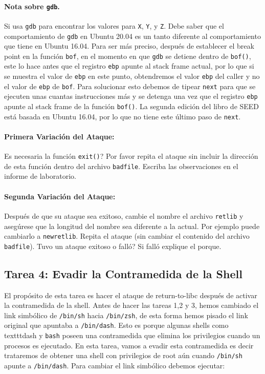 \paragraph{Nota sobre \texttt{gdb}.} Si usa \texttt{gdb} para encontrar los valores para \texttt{X}, \texttt{Y}, y \texttt{Z}. Debe saber que el comportamiento de \texttt{gdb} en Ubuntu 20.04 es un tanto diferente al comportamiento que tiene en Ubuntu 16.04. Para ser más preciso, después de establecer el break point en la función \texttt{bof}, en el momento en que \texttt{gdb} se detiene dentro de \texttt{bof()}, este lo hace antes que el registro \texttt{ebp} apunte al stack frame actual, por lo que si se muestra el valor de \texttt{ebp} en este punto, obtendremos el valor \texttt{ebp} del caller y no el valor de \texttt{ebp} de \texttt{bof}. Para solucionar esto debemos de tipear \texttt{next} para que se ejecuten unas cuantas instrucciones más y se detenga una vez que el registro \texttt{ebp} apunte al stack frame de la función \texttt{bof()}.
La segunda edición del libro de SEED está basada en Ubuntu 16.04, por lo que no tiene este último paso de \texttt{next}.


\paragraph{Primera Variación del Ataque:}
Es necesaria la función \texttt{exit()}? Por favor repita el ataque sin incluir la dirección de esta función dentro del archivo \texttt{badfile}. Escriba las observaciones en el informe de laboratorio.


\paragraph{Segunda Variación del Ataque:} 
Después de que su ataque sea exitoso, cambie el nombre el archivo \texttt{retlib} y asegúrese que la longitud del nombre sea diferente a la actual. Por ejemplo puede cambiarlo a \texttt{newretlib}. Repita el ataque (sin cambiar el contenido del archivo {\tt badfile}). 
Tuvo un ataque exitoso o falló? Si falló explique el porque.

\subsection{Tarea 4: Evadir la Contramedida de la Shell}

El propósito de esta tarea es hacer el ataque de return-to-libc después de activar la contramedida de la shell.
Antes de hacer las tareas 1,2 y 3, hemos cambiado el link simbólico de \texttt{/bin/sh} hacia \texttt{/bin/zsh}, de esta forma hemos pisado el link original que apuntaba a \texttt{/bin/dash}. Esto es porque algunas shells como texttt{dash} y \texttt{bash} poseen una contramedida que elimina los privilegios cuando un procesos \setuid es ejecutado. En esta tarea, vamos a evadir esta contramedida es decir trataremos de obtener una shell con privilegios de root aún cuando \texttt{/bin/sh} apunte a \texttt{/bin/dash}.  
Para cambiar el link simbólico debemos ejecutar:

